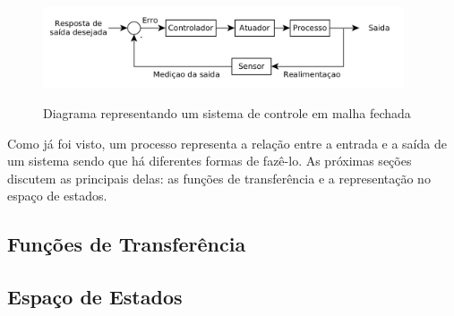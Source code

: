 \begin{figure}[!htb]
    \centering
    \caption{Diagrama representando um sistema de controle em malha fechada}
    \includegraphics[width=0.95\textwidth]{./04-figuras/fund_teorica/closed_loop_control_system}
    \label{fig:closed_loop_control_system}
\end{figure}

Como já foi visto, um processo representa a relação entre a entrada e a saída de um sistema sendo que há diferentes formas de fazê-lo. As próximas seções discutem as principais delas: as funções de transferência e a representação no espaço de estados.

\subsection{Funções de Transferência}
\label{subsec:fundamentacaoTeorica-tfs}



\subsection{Espaço de Estados}
\label{subsec:fundamentacaoTeorica-ss}




